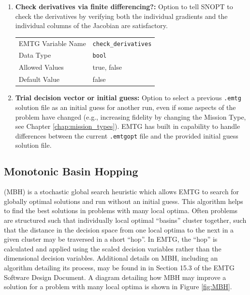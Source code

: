\begin{enumerate}
    
    \item \textbf{Check derivatives via finite differencing?:} Option to tell \ac{SNOPT} to check the derivatives by verifying both the individual gradients and the individual columns of the Jacobian are satisfactory.
    \begin{table}[H]
        \hspace{2cm}
        \begin{tabular}{lp{5cm}}
        \ac{EMTG} Variable Name & \verb|check_derivatives| \\
        Data Type & \verb|bool| \\
        Allowed Values & true, false \\
        Default Value & false \\
        \end{tabular}
    \end{table}
    
    \item \textbf{Trial decision vector or initial guess:} Option to select a previous {\tt .emtg} solution file as an initial guess for another run, even if some aspects of the problem have changed (e.g., increasing fidelity by changing the Mission Type, see Chapter \ref{chap:mission_types}). \ac{EMTG} has built in capability to handle differences between the current {\tt .emtgopt} file and the provided initial guess solution file. 

\end{enumerate}




\subsection{Monotonic Basin Hopping}
\label{sec:monotonic_basin_hopping}
(\ac{MBH}) is a stochastic global search heuristic which allows \ac{EMTG} to search for globally optimal solutions and run without an initial guess. This algorithm helps to find the best solutions in problems with many local optima. Often problems are structured such that individually local optimal ``basins'' cluster together, such that the distance in the decision space from one local optima to the next in a given cluster may be traversed in a short ``hop''. In \ac{EMTG}, the ``hop'' is calculated and applied using the scaled decision variables rather than the dimensional decision variables. Additional details on \ac{MBH}, including an algorithm detailing its process, may be found in in Section 15.3 of the \ac{EMTG} Software Design Document. A diagram detailing how \ac{MBH} may improve a solution for a problem with many local optima is shown in Figure \ref{fig:MBH}.

